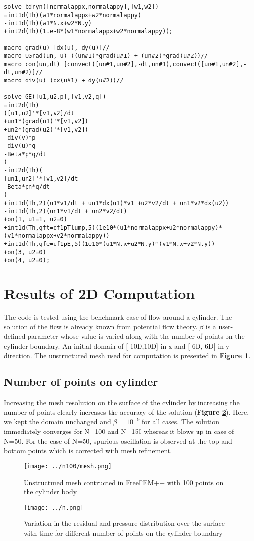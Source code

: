 \documentclass{article}
\begin{document}
\begin{lstlisting}[language=FreeFem, caption=Problem definition in FreeFEM++]
solve bdryn([normalappx,normalappy],[w1,w2])
=int1d(Th)(w1*normalappx+w2*normalappy)
-int1d(Th)(w1*N.x+w2*N.y)
+int2d(Th)(1.e-8*(w1*normalappx+w2*normalappy));

macro grad(u) [dx(u), dy(u)]//
macro UGrad(un, u) ((un#1)*grad(u#1) + (un#2)*grad(u#2))//
macro con(un,dt) [convect([un#1,un#2],-dt,un#1),convect([un#1,un#2],-dt,un#2)]//
macro div(u) (dx(u#1) + dy(u#2))//

solve GE([u1,u2,p],[v1,v2,q])
=int2d(Th)
([u1,u2]'*[v1,v2]/dt
+un1*(grad(u1)'*[v1,v2])
+un2*(grad(u2)'*[v1,v2])
-div(v)*p
-div(u)*q
-Beta*p*q/dt
)
-int2d(Th)(
[un1,un2]'*[v1,v2]/dt
-Beta*pn*q/dt   
)
+int1d(Th,2)(u1*v1/dt + un1*dx(u1)*v1 +u2*v2/dt + un1*v2*dx(u2))
-int1d(Th,2)(un1*v1/dt + un2*v2/dt)
+on(1, u1=1, u2=0)
+int1d(Th,qft=qf1pTlump,5)(1e10*(u1*normalappx+u2*normalappy)*(v1*normalappx+v2*normalappy))
+int1d(Th,qfe=qf1pE,5)(1e10*(u1*N.x+u2*N.y)*(v1*N.x+v2*N.y))
+on(3, u2=0)
+on(4, u2=0);
\end{lstlisting}

\section{Results of 2D Computation}
The code is tested using the benchmark case of flow around a cylinder. The solution of the flow is already known
from potential flow theory. $\beta$ is a user-defined parameter whose value is varied along with the number of points
on the cylinder boundary. An initial domain of [-10D,10D] in x and [-6D, 6D] in y-direction. The unstructured
mesh used for computation is presented in \textbf{Figure \ref{fig:mesh}}.

\subsection{Number of points on cylinder}
Increasing the mesh resolution on the surface of the cylinder by increasing the number of points clearly increases the
accuracy of the solution (\textbf{Figure \ref{fig:n}}). Here, we kept the domain unchanged and $\beta = 10^{-9}$ for all
cases. The solution immediately converges for N=100 and N=150 whereas it blows up in case of N=50. For the case of N=50,
spurious oscillation is observed at the top and bottom points which is corrected with mesh refinement.
\begin{figure}[H]
    \centering
    \texttt{[image: ../n100/mesh.png]}
    \caption{Unstructured mesh contructed in FreeFEM++ with 100 points on the cylinder body}
    \label{fig:mesh}
\end{figure}
\begin{figure}[H]
    \centering
    \texttt{[image: ../n.png]}
    \caption{Variation in the residual and pressure distribution over the surface with time for different number of points on the cylinder boundary}
    \label{fig:n}
\end{figure}
\end{document}
